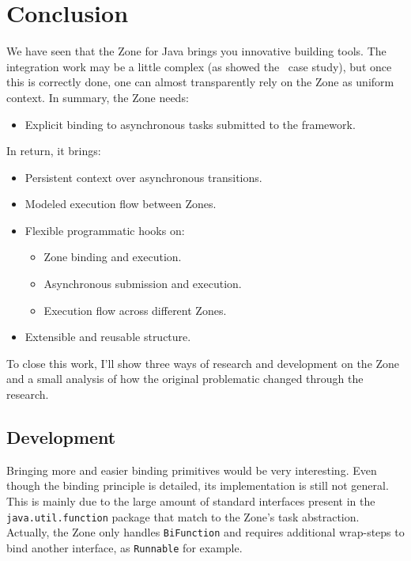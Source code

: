 
\chapter{Conclusion}
\label{ch:conclusion}

We have seen that the Zone for Java brings you innovative building tools. The integration work may be a little complex (as showed the \vertx\ case study), but once this is correctly done, one can almost transparently rely on the Zone as uniform context. In summary, the Zone needs:
\begin{itemize}
\item Explicit binding to asynchronous tasks submitted to the framework.
\end{itemize}

In return, it brings:
\begin{itemize}
\item Persistent context over asynchronous transitions.
\item Modeled execution flow between Zones.
\item Flexible programmatic hooks on:
  \begin{itemize}
  \item Zone binding and execution.
  \item Asynchronous submission and execution.
  \item Execution flow across different Zones.
  \end{itemize}
\item Extensible and reusable structure.
\end{itemize}

To close this work, I'll show three ways of research and development on the Zone and a small analysis of how the original problematic changed through the research.

\section{Development}

Bringing more and easier binding primitives would be very interesting. Even though the binding principle is detailed, its implementation is still not general. This is mainly due to the large amount of standard interfaces present in the \lstinline{java.util.function} package that match to the Zone's task abstraction. Actually, the Zone only handles \lstinline{BiFunction} and requires additional wrap-steps to bind another interface, as \lstinline{Runnable} for example.

